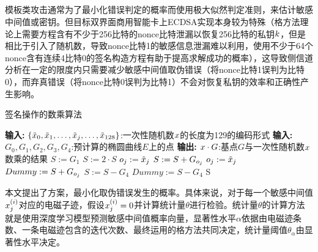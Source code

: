 {{	\subsection{\jiashejianyanguji}

	模板类攻击通常为了最小化错误判定的概率而使用极大似然判定准则，来估计敏感中间值或密钥。但目标双界面商用智能卡上ECDSA实现本身较为特殊（格方法理论上需要方程含有不少于256比特的nonce比特泄漏以恢复256比特的私钥$k$，但是相比于引入了随机数，导致nonce比特1的敏感信息泄漏难以利用，使用不少于64个nonce含有连续4比特0的签名构造方程有助于提高求解成功的概率），这导致侧信道分析在一定的限度内只需要减少敏感中间值取伪错误（将nonce比特1误判为比特0），而弃真错误（将nonce比特0误判为比特1）不会对恢复私钥的效率和正确性产生影响。
	
	\begin{algorithm}[!h]
		\caption{签名操作的数乘算法}\label{alg:signscalar}
		\begin{algorithmic}[1]
			\Statex \textbf{输入:} $\left\{\tilde{x}_0,\tilde{x}_1,\dots,\tilde{x}_j,\dots, \tilde{x}_{128}\right\}$:一次性随机数$x$的长度为129的编码形式
			\Statex \textbf{输入:} $G_0,G_1,G_2,G_3,G_4$:预计算的椭圆曲线$E$上的点
			\Statex \textbf{输出:} $x\cdot G$:基点$G$与一次性随机数$x$数乘的结果
			\State $S:=G_1$
			\State $S:=2\cdot S$
			\State $o_j:=\tilde {x}_j$
			\State $S:=S+G_{o_j}$
			\Else
			\State $o_j:=\tilde {x}_j$
			\State $Dummy:=S+G_{o_j}$
			\EndIf
			\EndFor
			\State $S:=S-G_4$
			\Else
			\State $Dummy:=S-G_4$
			\EndIf
			\State \Return S
		\end{algorithmic}
	\end{algorithm}
	
	本文提出了\jiashejianyanguji 方案，最小化取伪错误发生的概率。具体来说，对于每一个敏感中间值$x^{(i)}_j$对应的电磁子迹，假设$x^{(i)}_j=0$并计算统计量$\theta$进行检验。统计量$\theta$的计算方法就是使用深度学习模型预测敏感中间值概率向量，显著性水平$\alpha$依据由电磁迹条数、一条电磁迹包含的迭代次数、最终运用的格方法共同决定，统计量阈值$\theta_{\alpha}$由显著性水平决定。
	
	
}}

